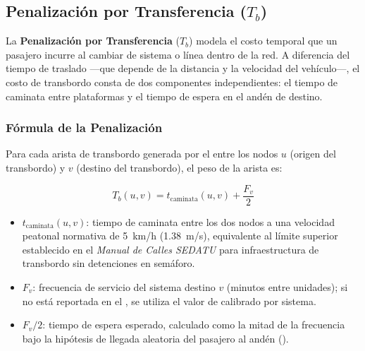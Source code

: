 \subsection{Penalización por Transferencia (\texorpdfstring{$T_b$}{Tb})}
\label{subsec:res-penalizacion-transferencia}

La \textbf{Penalización por Transferencia} ($T_b$) modela el costo temporal \DIFaddbegin {}\DIFaddend que un pasajero incurre al cambiar de sistema o línea dentro de la red. A diferencia
del tiempo de traslado —que depende de la distancia y la velocidad del vehículo—,
el costo de transbordo consta de dos componentes independientes: el tiempo de
caminata entre plataformas y el tiempo de espera en el andén de destino.

\subsubsection{Fórmula de la Penalización}
\label{subsubsec:formula-tb}

Para cada arista de transbordo generada por el 
entre los nodos $u$ (origen del transbordo) y $v$ (destino del transbordo), el
peso de la arista es:

\begin{equation}
    T_b(u, v) = t_{\text{caminata}}(u, v) + \frac{F_v}{2}
    \label{eq:tb-formula}
\end{equation}

\begin{itemize}
    \item $t_{\text{caminata}}(u, v)$: tiempo de caminata entre los dos nodos
    a una velocidad peatonal normativa de 5~km/h (1.38~m/s), equivalente al
    límite superior establecido en el \textit{Manual de Calles SEDATU}
    \parencite{sedatu2019manual} para infraestructura de transbordo sin detenciones
    en semáforo.
    \item $F_v$: frecuencia de servicio del sistema destino $v$ (minutos entre
    unidades); si no está reportada en el \geojson{}, se utiliza el valor
    de  calibrado por sistema.
    \item $F_v / 2$: tiempo de espera esperado, calculado como la mitad de la
    frecuencia bajo la hipótesis de llegada aleatoria del pasajero al andén
    ().
\end{itemize}

